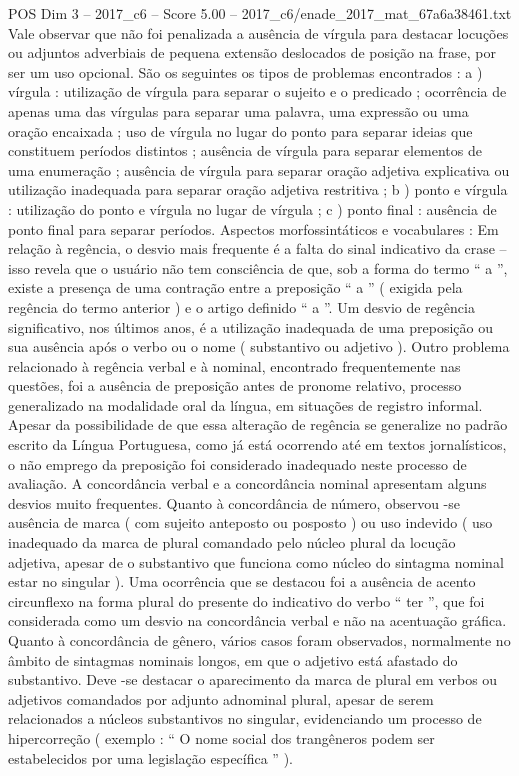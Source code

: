 \begin{textsample}{POS Dim 3 – 2017\_c6 – Score 5.00 – 2017\_c6/enade\_2017\_mat\_67a6a38461.txt}
Vale observar que não foi penalizada a ausência de vírgula para destacar locuções ou adjuntos adverbiais de pequena extensão deslocados de posição na frase, por ser um uso opcional.
São os seguintes os tipos de problemas encontrados : a ) vírgula : utilização de vírgula para separar o sujeito e o predicado ; ocorrência de apenas uma das vírgulas para separar uma palavra, uma expressão ou uma oração encaixada ; uso de vírgula no lugar do ponto para separar ideias que constituem períodos distintos ; ausência de vírgula para separar elementos de uma enumeração ; ausência de vírgula para separar oração adjetiva explicativa ou utilização inadequada para separar oração adjetiva restritiva ; b ) ponto e vírgula : utilização do ponto e vírgula no lugar de vírgula ; c ) ponto final : ausência de ponto final para separar períodos.
Aspectos morfossintáticos e vocabulares : Em relação à regência, o desvio mais frequente é a falta do sinal indicativo da crase – isso revela que o usuário não tem consciência de que, sob a forma do termo “ a ”, existe a presença de uma contração entre a preposição “ a ” ( exigida pela regência do termo anterior ) e o artigo definido “ a ”.
Um desvio de regência significativo, nos últimos anos, é a utilização inadequada de uma preposição ou sua ausência após o verbo ou o nome ( substantivo ou adjetivo ).
Outro problema relacionado à regência verbal e à nominal, encontrado frequentemente nas questões, foi a ausência de preposição antes de pronome relativo, processo generalizado na modalidade oral da língua, em situações de registro informal.
Apesar da possibilidade de que essa alteração de regência se generalize no padrão escrito da Língua Portuguesa, como já está ocorrendo até em textos jornalísticos, o não emprego da preposição foi considerado inadequado neste processo de avaliação.
A concordância verbal e a concordância nominal apresentam alguns desvios muito frequentes.
Quanto à concordância de número, observou -se ausência de marca ( com sujeito anteposto ou posposto ) ou uso indevido ( uso inadequado da marca de plural comandado pelo núcleo plural da locução adjetiva, apesar de o substantivo que funciona como núcleo do sintagma nominal estar no singular ).
Uma ocorrência que se destacou foi a ausência de acento circunflexo na forma plural do presente do indicativo do verbo “ ter ”, que foi considerada como um desvio na concordância verbal e não na acentuação gráfica.
Quanto à concordância de gênero, vários casos foram observados, normalmente no âmbito de sintagmas nominais longos, em que o adjetivo está afastado do substantivo.
Deve -se destacar o aparecimento da marca de plural em verbos ou adjetivos comandados por adjunto adnominal plural, apesar de serem relacionados a núcleos substantivos no singular, evidenciando um processo de hipercorreção ( exemplo : “ O nome social dos trangêneros podem ser estabelecidos por uma legislação específica ” ).

\end{textsample}
